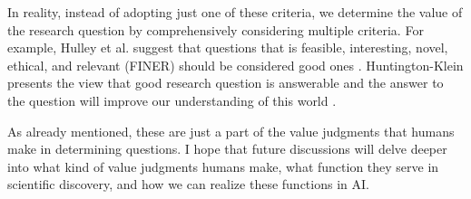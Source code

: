 In reality, instead of adopting just one of these criteria, we determine the value of the research question by comprehensively considering multiple criteria. For example, Hulley et al. suggest that questions that is feasible, interesting, novel, ethical, and relevant (FINER) should be considered good ones \cite{hulley2007designing}. Huntington-Klein presents the view that good research question is answerable and the answer to the question will improve our understanding of this world \cite{huntington2021effect}.

As already mentioned, these are just a part of the value judgments that humans make in determining questions. I hope that future discussions will delve deeper into what kind of value judgments humans make, what function they serve in scientific discovery, and how we can realize these functions in AI.





